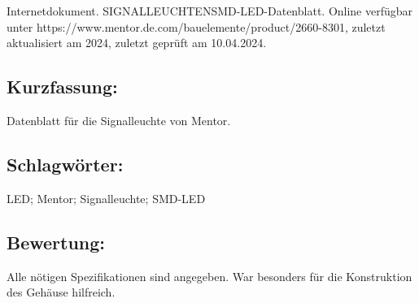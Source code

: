 \begin{minipage}{0.48\textwidth}
Internetdokument. SIGNALLEUCHTENSMD-LED-Datenblatt.
Online verfügbar unter https://www.mentor.de.com/bauelemente/product/2660-8301, zuletzt aktualisiert am 2024, zuletzt geprüft am 10.04.2024.	
\subsection*{Kurzfassung:}
Datenblatt für die  Signalleuchte von Mentor.
\subsection*{Schlagwörter:}
LED; Mentor; Signalleuchte; SMD-LED
\subsection*{Bewertung:}
Alle nötigen Spezifikationen sind angegeben. War besonders für die Konstruktion des Gehäuse hilfreich.
\end{minipage}

